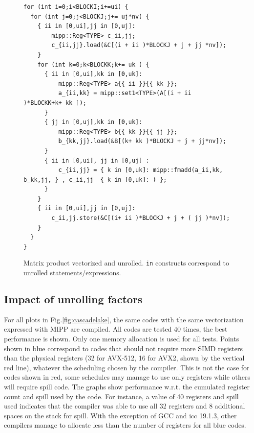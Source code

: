 \documentclass{article}
\begin{document}
\begin{figure}
  \begin{lstlisting}
for (int i=0;i<BLOCKI;i+=ui) {                
  for (int j=0;j<BLOCKJ;j+= uj*nv) {           
    { ii in [0,ui],jj in [0,uj]:
        mipp::Reg<TYPE> c_ii,jj;
        c_{ii,jj}.load(&C[(i + ii )*BLOCKJ + j + jj *nv]);
    }                
    for (int k=0;k<BLOCKK;k+= uk ) {            
      { ii in [0,ui],kk in [0,uk]:
          mipp::Reg<TYPE> a{{ ii }}{{ kk }};
          a_{ii,kk} = mipp::set1<TYPE>(A[(i + ii )*BLOCKK+k+ kk ]);
      }
      { jj in [0,uj],kk in [0,uk]:
          mipp::Reg<TYPE> b{{ kk }}{{ jj }};
          b_{kk,jj}.load(&B[(k+ kk )*BLOCKJ + j + jj*nv]);
      }    
      { ii in [0,ui], jj in [0,uj] :
          c_{ii,jj} = { k in [0,uk]: mipp::fmadd(a_ii,kk, b_kk,jj, } , c_ii,jj  { k in [0,uk]: ) };
      }
    }
    { ii in [0,ui],jj in [0,uj]:
        c_ii,jj.store(&C[(i+ ii )*BLOCKJ + j + ( jj )*nv]);      
    }
  }
}
  \end{lstlisting}
  \caption{Matrix product vectorized and unrolled\label{fig:gemm}. \texttt{in} constructs correspond to unrolled statements/expressions. }
\end{figure}


\subsection{Impact of unrolling factors}
For all plots in Fig.\ref{fig:cascadelake}, the same codes with the same vectorization expressed with MIPP are
compiled. All codes are tested 40 times, the best performance is shown. Only one memory allocation is used for all tests. Points shown in blue correspond to codes that should not require
more SIMD registers than the physical registers (32 for AVX-512, 16 for AVX2, shown by the vertical red line), whatever
the scheduling chosen by the compiler. This is not the case for codes
shown in red, some schedules may manage to use only registers while
others will require spill code. The graphs show performance w.r.t. the
cumulated register count and spill used by the code. For instance, a value of 40 registers and
spill used indicates that the compiler was able to use all 32
registers and 8 additional spaces on the stack for spill. With the exception of
GCC and icc 19.1.3, other compilers manage to allocate less than the number of registers for all
blue codes.
\end{document}
